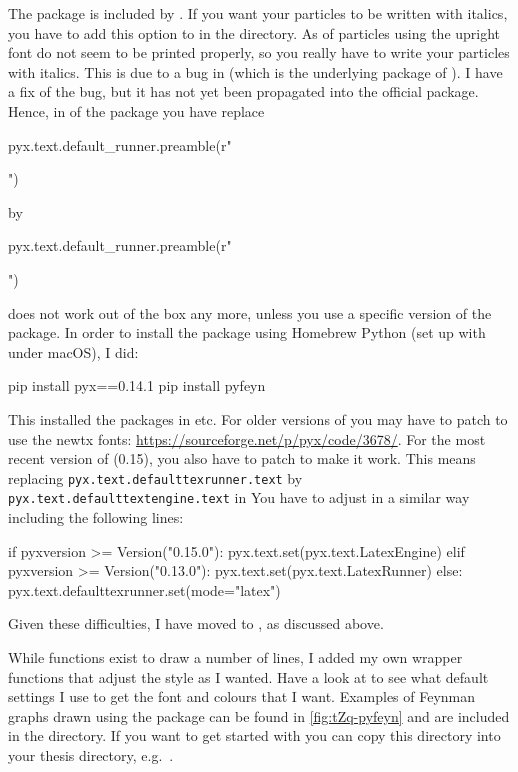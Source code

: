 The package  is included by .
If you want your particles to be written with italics,
you have to add this option to  in the  directory.
As of  particles using the upright font do not seem to be printed properly,
so you really have to write your particles with italics.
This is due to a bug in  (which is the underlying package of ).
I have a fix of the bug, but it has not yet been propagated into the official package.
Hence, in  of the package you have replace
\begin{bashlisting}
pyx.text.default_runner.preamble(r"\usepackage{hepnicenames}")
\end{bashlisting}
by
\begin{bashlisting}
pyx.text.default_runner.preamble(r"\usepackage[italic]{hepnicenames}")
\end{bashlisting}

 does not work out of the box any more,
unless you use a specific version of the  package.
In order to install the package using Homebrew Python (set up with  under macOS), I did:
\begin{bashlisting}
pip install pyx==0.14.1
pip install pyfeyn
\end{bashlisting}
\noindent This installed the packages in  etc.
For older versions of  you may have to patch 
to use the newtx fonts: \url{https://sourceforge.net/p/pyx/code/3678/}.
For the most recent version of  (0.15), you also have to patch  to make it work.
This means replacing
\verb+pyx.text.defaulttexrunner.text+ by
\verb+pyx.text.defaulttextengine.text+
in 
You have to adjust  in a similar way including the following lines:
\begin{bashlisting}
if pyxversion >= Version("0.15.0"):
    pyx.text.set(pyx.text.LatexEngine)
elif pyxversion >= Version("0.13.0"):
    pyx.text.set(pyx.text.LatexRunner)
else:
    pyx.text.defaulttexrunner.set(mode="latex")
\end{bashlisting}
%
\noindent Given these difficulties, I have moved to ,
as discussed above.

While functions exist to draw a number of lines, I added my own wrapper functions
that adjust the style as I wanted.
Have a look at  to see what default settings I use
to get the font and colours that I want.
Examples of Feynman graphs drawn using the package can be found in
\cref{fig:tZq-pyfeyn} and are included in the  directory.
If you want to get started with  you can copy this directory
into your thesis directory, e.g.\ .

